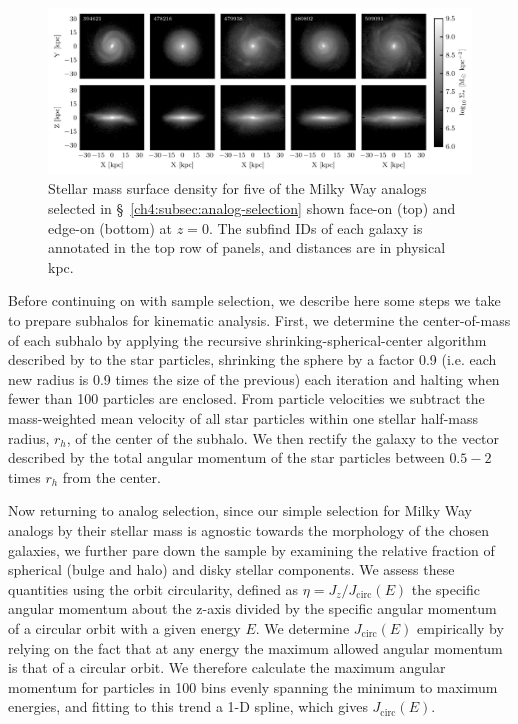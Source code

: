 \begin{figure}
    \centering
    \includegraphics[width=\textwidth]{figure/ch4/galaxy_xyz_projection.pdf}
    \caption{Stellar mass surface density for five of the Milky Way analogs selected in \S~\ref{ch4:subsec:analog-selection} shown face-on (top) and edge-on (bottom) at $z=0$. The subfind IDs of each galaxy is annotated in the top row of panels, and distances are in physical kpc.}
    \label{ch4:fig:galaxy-surface-density}
\end{figure}

Before continuing on with sample selection, we describe here some steps we take to prepare subhalos for kinematic analysis. First, we determine the center-of-mass of each subhalo by applying the recursive shrinking-spherical-center algorithm described by \textcite{power03} to the star particles, shrinking the sphere by a factor 0.9 (i.e. each new radius is 0.9 times the size of the previous) each iteration and halting when fewer than 100 particles are enclosed. From particle velocities we subtract the mass-weighted mean velocity of all star particles within one stellar half-mass radius, $r_{h}$, of the center of the subhalo. We then rectify the galaxy to the vector described by the total angular momentum of the star particles between $0.5-2$ times $r_{h}$ from the center.

Now returning to analog selection, since our simple selection for Milky Way analogs by their stellar mass is agnostic towards the morphology of the chosen galaxies, we further pare down the sample by examining the relative fraction of spherical (bulge and halo) and disky stellar components. We assess these quantities using the orbit circularity, defined as $\eta = J_{z}/J_\mathrm{circ}(E)$ the specific angular momentum about the z-axis divided by the specific angular momentum of a circular orbit with a given energy $E$. We determine $J_\mathrm{circ}(E)$ empirically by relying on the fact that at any energy the maximum allowed angular momentum is that of a circular orbit. We therefore calculate the maximum angular momentum for particles in 100 bins evenly spanning the minimum to maximum energies, and fitting to this trend a 1-D spline, which gives $J_\mathrm{circ}(E)$.

